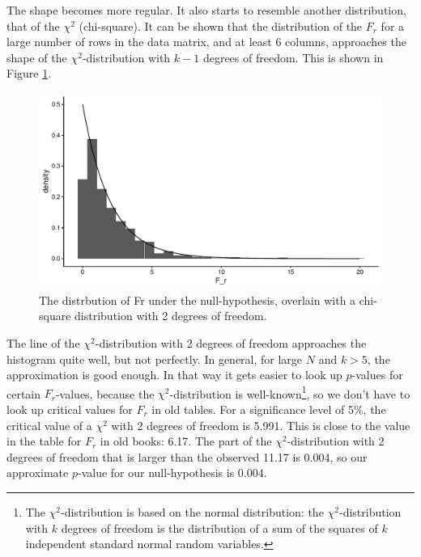 \documentclass[]{book}\usepackage[]{graphicx}\usepackage[]{color}
\makeatletter
\def\maxwidth{ %
  \ifdim\Gin@nat@width>\linewidth
    \linewidth
  \else
    \Gin@nat@width
  \fi
}
\newenvironment{knitrout}{}{} %
\makeatother
\begin{document}
The shape becomes more regular. It also starts to resemble another distribution, that of the $\chi^2$ (chi-square). It can be shown that the distribution of the $F_r$ for a large number of rows in the data matrix, and at least 6 columns, approaches the shape of the $\chi^2$-distribution with $k-1$ degrees of freedom. This is shown in Figure \ref{fig:nonparmixed_56}.

\begin{knitrout}
\color{fgcolor}\begin{figure}

{\centering \includegraphics[width=\maxwidth]{figure/nonparmixed_56-1} 

}

\caption[The distrbution of Fr under the null-hypothesis, overlain with a chi-square distribution with 2 degrees of freedom]{The distrbution of Fr under the null-hypothesis, overlain with a chi-square distribution with 2 degrees of freedom.}\label{fig:nonparmixed_56}
\end{figure}


\end{knitrout}

The line of the $\chi^2$-distribution with 2 degrees of freedom approaches the histogram quite well, but not perfectly. In general, for large $N$ and $k>5$, the approximation is good enough. In that way it gets easier to look up $p$-values for certain $F_r$-values, because the $\chi^2$-distribution is well-known\footnote{The $\chi^2$-distribution is based on the normal distribution: the $\chi^2$-distribution with $k$ degrees of freedom is the distribution of a sum of the squares of $k$ independent standard normal random variables.}, so we don't have to look up critical values for $F_r$ in old tables. For a significance level of 5\%, the critical value of a $\chi^2$ with 2 degrees of freedom is 5.991. This is close to the value in the table for $F_r$ in old books: 6.17. The part of the $\chi^2$-distribution with 2 degrees of freedom that is larger than the observed 11.17 is 0.004, so our approximate $p$-value for our null-hypothesis is 0.004.
\end{document}
